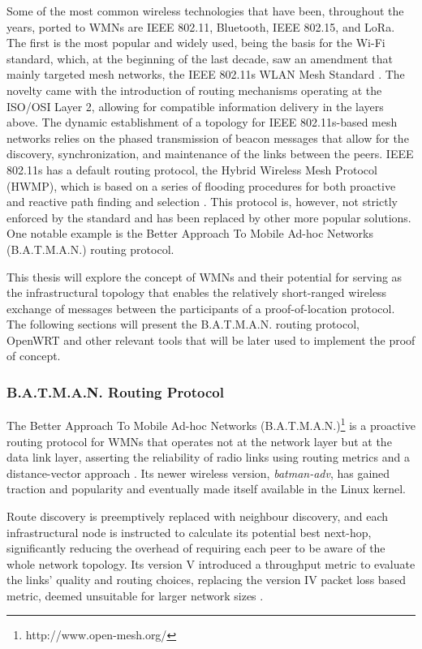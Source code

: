 Some of the most common wireless technologies that have been, throughout the years, ported to WMNs are IEEE 802.11, Bluetooth, IEEE 802.15, and LoRa. The first is the most popular and widely used, being the basis for the Wi-Fi standard, which, at the beginning of the last decade, saw an amendment that mainly targeted mesh networks, the IEEE 802.11s WLAN Mesh Standard \cite{hiertz2010ieee}. The novelty came with the introduction of routing mechanisms operating at the ISO/OSI Layer 2, allowing for compatible information delivery in the layers above. The dynamic establishment of a topology for IEEE 802.11s-based mesh networks relies on the phased transmission of beacon messages that allow for the discovery, synchronization, and maintenance of the links between the peers. IEEE 802.11s has a default routing protocol, the Hybrid Wireless Mesh Protocol (HWMP), which is based on a series of flooding procedures for both proactive and reactive path finding and selection \cite{bari2012performance}. This protocol is, however, not strictly enforced by the standard and has been replaced by other more popular solutions. One notable example is the Better Approach To Mobile Ad-hoc Networks (B.A.T.M.A.N.) routing protocol.

This thesis will explore the concept of WMNs and their potential for serving as the infrastructural topology that enables the relatively short-ranged wireless exchange of messages between the participants of a proof-of-location protocol. The following sections will present the B.A.T.M.A.N. routing protocol, OpenWRT and other relevant tools that will be later used to implement the proof of concept.

\subsubsection{B.A.T.M.A.N. Routing Protocol}

The Better Approach To Mobile Ad-hoc Networks (B.A.T.M.A.N.)\footnote{http://www.open-mesh.org/} is a proactive routing protocol for WMNs that operates not at the network layer but at the data link layer, asserting the reliability of radio links using routing metrics and a distance-vector approach \cite{seither2011routing}. Its newer wireless version, \emph{batman-adv}, has gained traction and popularity and eventually made itself available in the Linux kernel.

Route discovery is preemptively replaced with neighbour discovery, and each infrastructural node is instructed to calculate its potential best next-hop, significantly reducing the overhead of requiring each peer to be aware of the whole network topology. Its version V introduced a throughput metric to evaluate the links' quality and routing choices, replacing the version IV packet loss based metric, deemed unsuitable for larger network sizes \cite{seither2011routing}.

